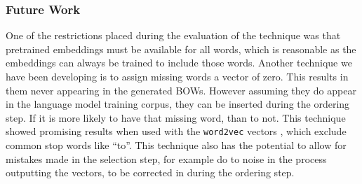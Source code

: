 \documentclass[11pt]{article}
\theoremstyle{plain}
\theoremstyle{definition}
\begin{document}
\subsubsection{Future Work}\label{future}
One of the restrictions placed during the evaluation of the technique was that pretrained embeddings must be available for all words, which is reasonable as the embeddings can always be trained to include those words. Another technique we have been developing is to assign missing words a vector of zero. This results in them never appearing in the generated BOWs. However assuming they do appear in the language model training corpus, they can be inserted during the ordering step. If it is more likely to have that missing word, than to not. This technique showed promising results when used with the \texttt{word2vec} vectors \parencite{mikolovSkip}, which exclude common stop words like ``to''. This technique also has the potential to allow for mistakes made in the selection step, for example do to noise in the process outputting the vectors, to be corrected in during the ordering step.




\printbibliography
	
\end{document}
